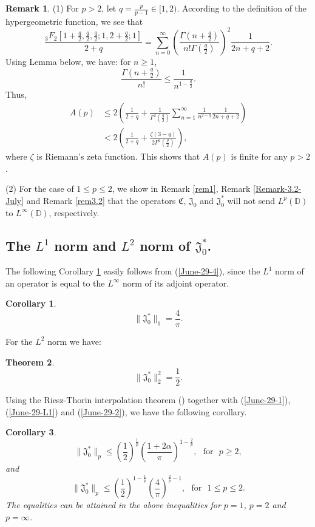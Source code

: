 \documentclass[a4paper,12pt]{amsart}
\makeatletter
\newtheorem{thm}{Theorem}[section]
\newtheorem{cor}[thm]{Corollary}
\theoremstyle{definition}
\newtheorem{rem}{Remark}[section]%
\numberwithin{equation}{section}
\newcounter{tmp}
\newcounter{tmp2}
\newcommand{\Ref}[1]{\@ifundefined{r@#1}{}{\setcounter{tmp}{\ref{#1}}\Alph{tmp}}}
\newcommand{\ID}{{\mathbb D}}
\def\be{\begin{equation}}
\def\ee{\end{equation}}
\makeatother
\begin{document}
\begin{rem}\label{Rem-3.2}
(1)
For $p>2$, let $q=\frac{p}{p-1}\in[1, 2)$. According to the definition of the hypergeometric function, we see that
$$\frac{{}_3F_2[1+\frac{q}{2}, \frac{q}{2},\frac{q}{2}; 1, 2+\frac{q}{2}; 1 ]}{2+q}=\sum\limits_{n=0}^{\infty}\left(\frac{\Gamma(n+\frac{q}{2})}{n!\Gamma(\frac{q}{2})}\right)^2\frac{1}{2n+q+2}.$$
Using Lemma \Ref{DZ-2019-lem-0} below, we have: for $n\geq1$,
$$\frac{\Gamma(n+\frac{q}{2})}{n!}\leq\frac{1}{n^{1-\frac{q}{2}}}.$$
Thus,
\begin{align*}
A(p)&\leq2\left(\frac{1}{2+q}+\frac{1}{\Gamma^2(\frac{q}{2})}\sum\limits_{n=1}^{\infty}\frac{1}{n^{2-q}}\frac{1}{2n+q+2}\right)\\ \nonumber
&<2\left(\frac{1}{2+q}+\frac{\zeta(3-q)}{2\Gamma^2(\frac{q}{2})}\right),
\end{align*}
where $\zeta$ is Riemann's zeta function. This shows that $A(p)$ is finite for any $p>2$.

(2) For the case of $1\leq p\leq2$, we show in Remark \ref{rem1}, Remark \ref{Remark-3.2-July} and Remark \ref{rem3.2} that the operators
$\mathfrak{C}$, $\mathfrak{J}_0$ and $\mathfrak{J}_0^*$ will not send $L^p(\ID)$ to $L^{\infty}(\ID)$, respectively.
\end{rem}


\subsection{The $L^1$ norm and $L^2$ norm of $\mathfrak{J}_0^*$.}
The following Corollary \ref{thm-L1-BC} easily follows from (\ref{June-29-4}), since
the $L^1$ norm of an operator is equal to the $L^\infty$ norm of its adjoint operator.

\begin{cor}\label{thm-L1-BC}
\be\label{June-29-L1}\|\mathfrak{J}_0^*\|_{1}=\frac{4}{\pi}.\ee
\end{cor}

For the $L^2$ norm we have:

\begin{thm}\label{thm-L2-BC}
\be\label{June-29-2}\|\mathfrak{J}_0^*\|_{2}^2=\frac{1}{2}.\ee
\end{thm}
Using the Riesz-Thorin interpolation theorem (\cite[Theorem 1.1.1]{Bergh}) together with (\ref{June-29-1}), (\ref{June-29-L1}) and (\ref{June-29-2}), we have the following corollary.
\begin{cor}\label{Reiz-Thorin}
$$\|\mathfrak{J}_0^*\|_{p}\leq \left(\frac{1}{2}\right)^{\frac{1}{p}}\left(\frac{1+2\alpha}{\pi}\right)^{1-\frac{2}{p}},\ \ \ \mbox{for}\ \ \ p\geq2,$$
and
$$\|\mathfrak{J}_0^*\|_{p}\leq \left(\frac{1}{2}\right)^{1-\frac{1}{p}}\left(\frac{4}{\pi}\right)^{\frac{2}{p}-1},\ \ \ \mbox{for}\ \ \ 1\leq p\leq2.$$
The equalities can be attained in the above inequalities for $p=1$, $p=2$ and $p=\infty$.
\end{cor}
\end{document}

